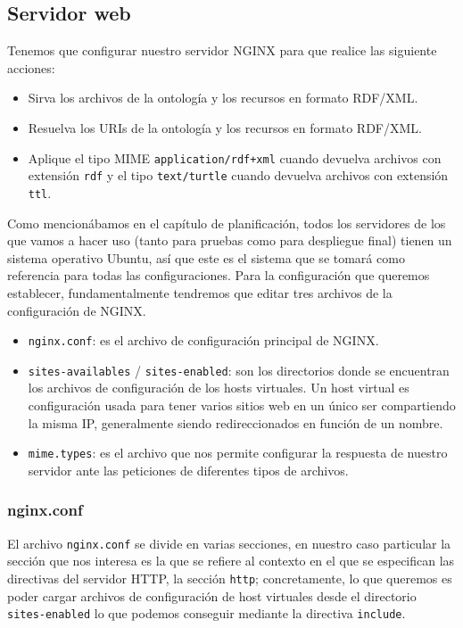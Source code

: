 \subsection{Servidor web}

Tenemos que configurar nuestro servidor {\sf NGINX} para que realice las siguiente acciones:

\begin{itemize}
	\item Sirva los archivos de la ontología y los recursos en formato {\sf RDF/XML}.
	\item Resuelva los {\sf URIs} de la ontología y los recursos en formato {\sf RDF/XML}.
	\item Aplique el tipo {\sf MIME} {\tt application/rdf+xml} cuando devuelva archivos con extensión {\tt rdf} y el tipo {\tt text/turtle} cuando devuelva archivos con extensión {\tt ttl}.
\end{itemize}

Como mencionábamos en el capítulo de planificación, todos los servidores de los que vamos a hacer uso (tanto para pruebas como para despliegue final) tienen un sistema operativo {\sf Ubuntu}, así que este es el sistema que se tomará como referencia para todas las configuraciones. Para la configuración que queremos establecer, fundamentalmente tendremos que editar tres archivos de la configuración de {\sf NGINX}.

\begin{itemize}
	\item {\tt nginx.conf}: es el archivo de configuración principal de {\sf NGINX}.
	\item {\tt sites-availables} / {\tt sites-enabled}: son los directorios donde se encuentran los archivos de configuración de los {\sf hosts virtuales}. Un host virtual es configuración usada para tener varios sitios web en un único ser compartiendo la misma IP, generalmente siendo redireccionados en función de un nombre.
	\item {\tt mime.types}: es el archivo que nos permite configurar la respuesta de nuestro servidor ante las peticiones de diferentes tipos de archivos.
\end{itemize}

\subsubsection{nginx.conf}

El archivo {\tt nginx.conf} se divide en varias secciones, en nuestro caso particular la sección que nos interesa es la que se refiere al contexto en el que se especifican las directivas del {\sf servidor HTTP}, la sección {\tt http}; concretamente, lo que queremos es poder cargar archivos de configuración de host virtuales desde el directorio {\tt sites-enabled} lo que podemos conseguir mediante la directiva {\tt include}.
\bigskip

